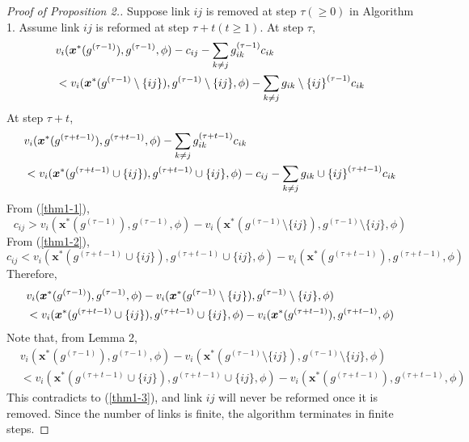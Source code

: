 \documentclass[12pt]{article}
\theoremstyle{definition}
\newcommand{\bm}[1]{\boldsymbol{#1}}
\begin{document}
\begin{proof}[Proof of Proposition 2.]
	Suppose link $ij$ is removed at step $\tau(\ge0)$ in Algorithm 1.
	Assume link $ij$ is reformed at step $\tau + t (t \ge 1)$.
	At step $\tau$,
	\begin{align}
		\label{thm1-1}
		& v_i(\bm{x}^*(g^{(\tau - 1)}), g^{(\tau - 1)}, \phi) - c_{ij} - \sum_{k \neq j} g_{ik}^{(\tau - 1)} c_{ik} \notag \\
			& < v_i(\bm{x}^*(g^{(\tau - 1)} \setminus \{ ij \}), g^{(\tau - 1)} \setminus \{ ij \}, \phi) - \sum_{k \neq j} {g_{ik} \setminus \{ ij \}}^{(\tau - 1)} c_{ik}
	\end{align}
	At step $\tau + t$,
	\begin{align}
		\label{thm1-2}
		& v_i(\bm{x}^*(g^{(\tau + t-1)}), g^{(\tau + t-1)}, \phi) - \sum_{k \neq j} g_{ik}^{(\tau + t-1)} c_{ik} \notag \\
			& < v_i(\bm{x}^*(g^{(\tau + t-1)} \cup \{ ij \}), g^{(\tau + t-1)} \cup \{ ij \}, \phi) - c_{ij} - \sum_{k \neq j} {g_{ik} \cup \{ ij \}}^{(\tau + t-1)} c_{ik}
	\end{align}
	From (\ref{thm1-1}),
	\[ c_{ij} > v_i(\bm{x}^*(g^{(\tau - 1)}), g^{(\tau - 1)}, \phi) - v_i(\bm{x}^*(g^{(\tau - 1)} \setminus \{ ij \}), g^{(\tau - 1)} \setminus \{ ij \}, \phi) \]
	From (\ref{thm1-2}),
	\[ c_{ij} < v_i(\bm{x}^*(g^{(\tau + t-1)} \cup \{ ij \}), g^{(\tau + t-1)} \cup \{ ij \}, \phi) - v_i(\bm{x}^*(g^{(\tau + t-1)}), g^{(\tau + t-1)}, \phi) \]
	Therefore,
	\begin{align}
		\label{thm1-3}
		& v_i(\bm{x}^*(g^{(\tau - 1)}), g^{(\tau - 1)}, \phi) - v_i(\bm{x}^*(g^{(\tau - 1)} \setminus \{ ij \}), g^{(\tau - 1)} \setminus \{ ij \}, \phi) \notag \\
			& < v_i(\bm{x}^*(g^{(\tau + t-1)} \cup \{ ij \}), g^{(\tau + t-1)} \cup \{ ij \}, \phi) - v_i(\bm{x}^*(g^{(\tau + t-1)}), g^{(\tau + t-1)}, \phi)
	\end{align}
	Note that, from Lemma 2,
	\begin{align*}
		& v_i(\bm{x}^*(g^{(\tau - 1)}), g^{(\tau - 1)}, \phi) - v_i(\bm{x}^*(g^{(\tau - 1)} \setminus \{ ij \}), g^{(\tau - 1)} \setminus \{ ij \}, \phi) \\
			& < v_i(\bm{x}^*(g^{(\tau + t-1)} \cup \{ ij \}), g^{(\tau + t-1)} \cup \{ ij \}, \phi) - v_i(\bm{x}^*(g^{(\tau + t-1)}), g^{(\tau + t-1)}, \phi)
	\end{align*}
	This contradicts to (\ref{thm1-3}), and link $ij$ will never be reformed once it is removed.
	Since the number of links is finite, the algorithm terminates in finite steps.
\end{proof}
\end{document}
